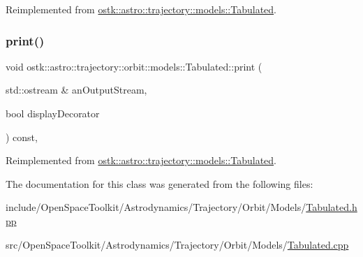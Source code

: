 Reimplemented from \hyperlink{classostk_1_1astro_1_1trajectory_1_1models_1_1_tabulated_a9d206aee35ebabe4b36ddfc057142f16}{ostk\+::astro\+::trajectory\+::models\+::\+Tabulated}.

\mbox{\label{classostk_1_1astro_1_1trajectory_1_1orbit_1_1models_1_1_tabulated_a66be3f1f23a464c666c38a3adcc3bab5}} 
\subsubsection{\texorpdfstring{print()}{print()}}
{\footnotesize\ttfamily void ostk\+::astro\+::trajectory\+::orbit\+::models\+::\+Tabulated\+::print (\begin{DoxyParamCaption}\item[{std\+::ostream \&}]{an\+Output\+Stream,  }\item[{bool}]{display\+Decorator }\end{DoxyParamCaption}) const\hspace{0.3cm}{\ttfamily [override]}, {\ttfamily [virtual]}}



Reimplemented from \hyperlink{classostk_1_1astro_1_1trajectory_1_1models_1_1_tabulated_a330bfffa50eb77eb7f6d45cfec1e9e29}{ostk\+::astro\+::trajectory\+::models\+::\+Tabulated}.



The documentation for this class was generated from the following files\+:\begin{DoxyCompactItemize}
\item 
include/\+Open\+Space\+Toolkit/\+Astrodynamics/\+Trajectory/\+Orbit/\+Models/\hyperlink{_trajectory_2_orbit_2_models_2_tabulated_8hpp}{Tabulated.\+hpp}\item 
src/\+Open\+Space\+Toolkit/\+Astrodynamics/\+Trajectory/\+Orbit/\+Models/\hyperlink{_trajectory_2_orbit_2_models_2_tabulated_8cpp}{Tabulated.\+cpp}\end{DoxyCompactItemize}
